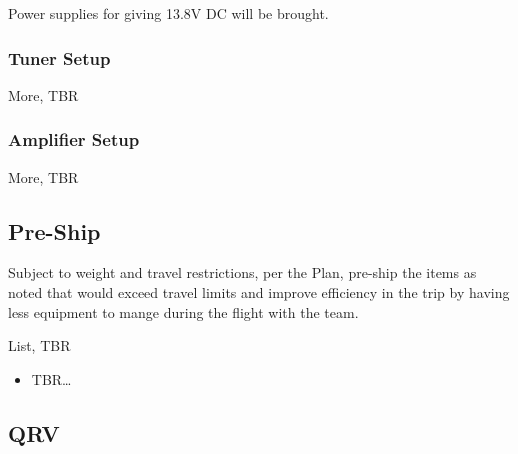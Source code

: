 \documentclass[11pt]{article}
\begin{document}
Power supplies for giving 13.8V DC will be brought.

\subsubsection{Tuner Setup}

More, TBR

\subsubsection{Amplifier Setup}

More, TBR

\subsection{Pre-Ship}

Subject to weight and travel restrictions, per the Plan, pre-ship the items
as noted that would exceed travel limits and improve efficiency
in the trip by having less equipment to mange during the flight with the team.
\par
List, TBR
\begin{itemize}
\item TBR\ldots
\end{itemize}

\subsection{QRV}
\end{document}
